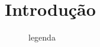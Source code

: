 \chapter{Introdução}\label{ch:intro}

\lipsum[1]

\begin{figure}[!h]
    \caption{legenda}
    \centering
    
\end{figure}
\lipsum[2]


